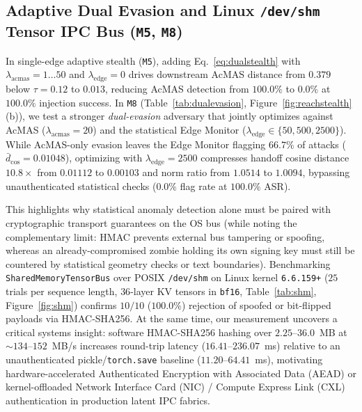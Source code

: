 \documentclass{article}
\begin{document}
\subsection{Adaptive Dual Evasion and Linux \texttt{/dev/shm} Tensor IPC Bus (\texttt{M5}, \texttt{M8})}
\label{sec:results-shm}
In single-edge adaptive stealth (\texttt{M5}), adding Eq.~\eqref{eq:dualstealth}
with $\lambda_{\text{acmas}}=1\dots 50$ and $\lambda_{\text{edge}}=0$ drives downstream AcMAS distance from $0.379$ below
$\tau=0.12$ to $0.013$, reducing AcMAS detection from $100.0\%$ to $0.0\%$ at
$100.0\%$ injection success. In \texttt{M8} (Table~\ref{tab:dualevasion},
Figure~\ref{fig:reachstealth}(b)), we test a stronger \emph{dual-evasion}
adversary that jointly optimizes against AcMAS ($\lambda_{\text{acmas}}=20$) and
the statistical Edge Monitor ($\lambda_{\text{edge}}\in\{50,500,2500\}$). While
AcMAS-only evasion leaves the Edge Monitor flagging $66.7\%$ of attacks
($\bar d_{\cos}=0.01048$), optimizing with $\lambda_{\text{edge}}=2500$
compresses handoff cosine distance $10.8\times$ from $0.01112$ to $0.00103$
and norm ratio from $1.0514$ to $1.0094$, bypassing unauthenticated statistical
checks ($0.0\%$ flag rate at $100.0\%$ ASR).

This highlights why statistical anomaly detection alone must be paired with
cryptographic transport guarantees on the OS bus (while noting the complementary
limit: HMAC prevents external bus tampering or spoofing, whereas an
already-compromised zombie holding its own signing key must still be countered
by statistical geometry checks or text boundaries). Benchmarking
\texttt{SharedMemoryTensorBus} over POSIX \texttt{/dev/shm} on Linux kernel
\texttt{6.6.159+} ($25$ trials per sequence length, $36$-layer KV tensors in
\texttt{bf16}, Table~\ref{tab:shm}, Figure~\ref{fig:shm}) confirms $10/10$
($100.0\%$) rejection of spoofed or bit-flipped payloads via HMAC-SHA256. At the
same time, our measurement uncovers a critical systems insight: software
HMAC-SHA256 hashing over $2.25$--$36.0$~MB at $\sim 134$--$152$~MB/s increases
round-trip latency ($16.41\text{--}236.07$~ms) relative to an unauthenticated
pickle/\texttt{torch.save} baseline ($11.20\text{--}64.41$~ms), motivating
hardware-accelerated Authenticated Encryption with Associated Data (AEAD) or
kernel-offloaded Network Interface Card (NIC) / Compute Express Link (CXL)
authentication in production latent IPC fabrics.
\end{document}
